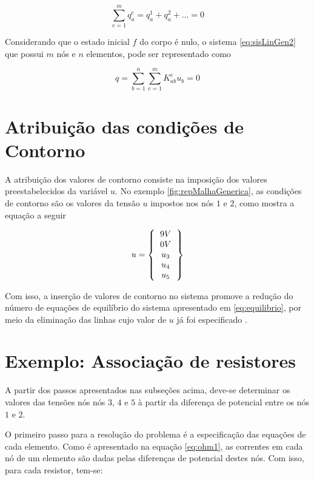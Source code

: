 \documentclass[
    12pt,               %
    openright,          %
    oneside,
    a4paper,            %
    english,            %
    french,             %
    spanish,            %
    brazil              %
    ]{abntex2}
\begin{document}
\begin{apendicesenv}
\begin{equation}
\label{eq:somaForcas}
\sum_{e=1}^{m}{q_a^e = q_a^1 + q_a^2 + \dots = 0}
\end{equation}

Considerando que o estado inicial $f$ do corpo é nulo, o sistema \ref{eq:sisLinGen2} que possui $m$ nós e $n$ elementos, pode ser representado como 

\begin{equation}
\label{eq:equilibrio}
q =
\sum_{b=1}^{n}\sum_{e=1}^{m}{K_{ab}^e u_b = 0}
\end{equation}


\section{Atribuição das condições de Contorno}
A atribuição dos valores de contorno consiste na imposição dos valores preestabelecidos da variável $u$. No exemplo \ref{fig:repMalhaGenerica}, as condições de contorno são os valores da tensão $u$  impostos nos nós $1$ e $2$, como mostra a equação a seguir

\begin{equation}
\label{eq:condIni}
u = 
\left \{
\begin{tabular}{c}
$9V$ \\
$0V$ \\
$u_3$ \\
$u_4$ \\
$u_5$ \\
\end{tabular}       
\right \}   
\end{equation}

Com isso, a inserção de valores de contorno no sistema promove a redução do número de equações de equilíbrio do sistema apresentado em \ref{eq:equilibrio}, por meio da eliminação das linhas cujo valor de $u$ já foi especificado \cite[p. 5]{zien}.

\section{Exemplo: Associação de resistores}

A partir dos passos apresentados nas subseções acima, deve-se determinar os valores das tensões nós nós $3$, $4$ e $5$ à partir da diferença de potencial entre os nós $1$ e $2$.

O primeiro passo para a resolução do problema é a especificação das equações de cada elemento. Como é apresentado na equação \ref{eq:ohm1}, as correntes em cada nó de um elemento são dadas pelas diferenças de potencial destes nós. Com isso, para cada resistor, tem-se:


\end{apendicesenv}
\end{document}
